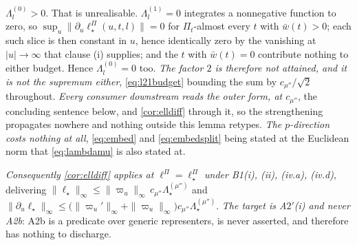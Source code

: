\begin{lemma}
\begin{enumerate}
$\Lambda^{(0)}_l>0$. That is unrealisable. $\Lambda^{(1)}_l=0$ integrates a nonnegative function to zero,
so $\sup_u\|\partial_u\ell^\Pi_\star(u,t,l)\|=0$ for $\Pi_t$-almost every $t$ with $\bar w(t)>0$; each
such slice is then constant in $u$, hence identically zero by the vanishing at $|u|\to\infty$ that clause
\textup{(i)} supplies; and the $t$ with $\bar w(t)=0$ contribute nothing to either budget. Hence
$\Lambda^{(0)}_l=0$ too. \emph{The factor $2$ is therefore not attained, and it is not the supremum
either}, \eqref{eq:l21budget} bounding the sum by $c_{\mu''}/\sqrt2$ throughout.
\emph{Every consumer downstream reads the outer form, at $c_{\mu''}$}, the concluding sentence below,
and \cref{cor:elldiff} through it, so the strengthening propagates
nowhere and nothing outside this lemma retypes.
\emph{The $p$-direction costs nothing at all}, \eqref{eq:embed} and \eqref{eq:embedsplit} being stated at
the Euclidean norm that \eqref{eq:lambdamu} is also stated at.
\end{enumerate}
\emph{Consequently \cref{cor:elldiff} applies at $\ell^\Pi=\ell^\Pi_\star$ under B1(i), (ii), (iv.a), (iv.d)},
delivering $\|\ell_\star\|_\infty\le\|\varpi_u\|_\infty\,c_{\mu''}\Lambda^{(\mu'')}_\star$ and
$\|\partial_u\ell_\star\|_\infty\le\big(\|\varpi_u'\|_\infty+\|\varpi_u\|_\infty\big)c_{\mu''}\Lambda^{(\mu'')}_\star$.
\emph{The target is A$2'$(i) and never A2b}: A2b is a predicate over generic representers, is never
asserted, and therefore has nothing to discharge.
\end{lemma}

